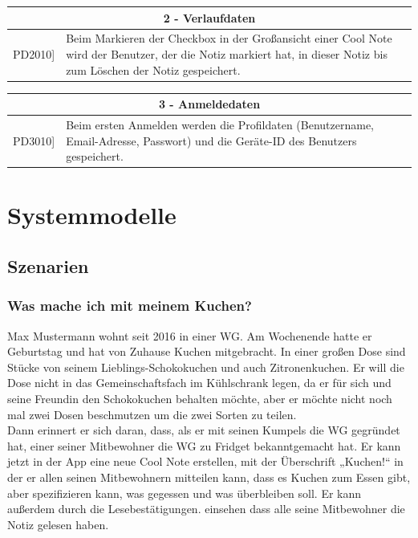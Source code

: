 \documentclass[a4paper]{scrreprt}
\begin{document}
    	\begin{table}[h!]
    		\centering
    		\label{my-label}
    		\begin{tabular}{p{2cm}p{12cm}}
    			
    			\multicolumn{2}{c}{\textbf{2 - Verlaufdaten}} \\ \hline
    			\centering{[}PD2010{]} & Beim Markieren der Checkbox in der Großansicht einer Cool Note wird der Benutzer, der die Notiz markiert hat, in dieser Notiz bis zum Löschen der Notiz gespeichert. \\ 
    			\hline
    		\end{tabular}
    	\end{table}
    	
    	\begin{table}[h!]
    		\centering
    		\label{my-label}
    		\begin{tabular}{p{2cm}p{12cm}}
    			
    			\multicolumn{2}{c}{\textbf{3 - Anmeldedaten}} \\ \hline
    			\centering{[}PD3010{]} & Beim ersten Anmelden werden die Profildaten (Benutzername, Email-Adresse, Passwort) und die Geräte-ID des Benutzers gespeichert.\\ 
    			\hline
    		\end{tabular}
    	\end{table}
    
    \chapter{Systemmodelle}
        \section{Szenarien}
        
        
        \subsection{Was mache ich mit meinem Kuchen?}
        Max Mustermann wohnt seit 2016 in einer WG. Am Wochenende hatte er Geburtstag und hat von Zuhause Kuchen mitgebracht. In einer großen Dose sind Stücke von seinem Lieblings-Schokokuchen und auch Zitronenkuchen. Er will die Dose nicht in das Gemeinschaftsfach im Kühlschrank legen, da er für sich und seine Freundin den Schokokuchen behalten möchte, aber er möchte nicht noch mal zwei Dosen beschmutzen um die zwei Sorten zu teilen.\\
        Dann erinnert er sich daran, dass, als er mit seinen Kumpels die WG gegründet hat, einer seiner Mitbewohner die WG zu Fridget bekanntgemacht hat. Er kann jetzt in der App eine neue Cool Note erstellen, mit der Überschrift „Kuchen!“ in der er allen seinen Mitbewohnern mitteilen kann, dass es Kuchen zum Essen gibt, aber spezifizieren kann, was gegessen und was überbleiben soll. Er kann außerdem durch die Lesebestätigungen. einsehen dass alle seine Mitbewohner die Notiz gelesen haben.
        \\
        
\end{document}
